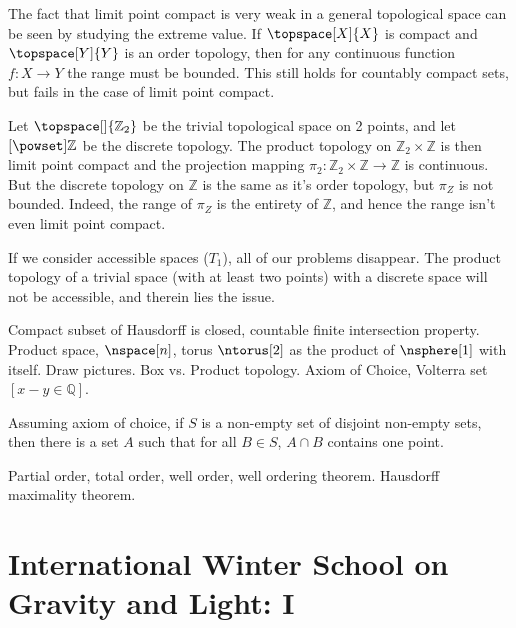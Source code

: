 \documentclass{article}                                                        %
\begin{document}
        The fact that limit point compact is very weak in a general topological
        space can be seen by studying the extreme value. If
        $\topspace[X]{X}$ is compact and $\topspace[Y]{Y}$ is an order topology,
        then for any continuous function $f:X\rightarrow{Y}$ the range must be
        bounded. This still holds for countably compact sets, but fails in the
        case of limit point compact.
        \begin{example}
            Let $\topspace[\empty]{\mathbb{Z}_{2}}$ be the trivial topological
            space on 2 points, and let $\mathcal[\powset]{\mathbb{Z}}$ be the
            discrete topology. The product topology on
            $\mathbb{Z}_{2}\times\mathbb{Z}$ is then limit point compact and the
            projection mapping
            $\pi_{2}:\mathbb{Z}_{2}\times\mathbb{Z}\rightarrow\mathbb{Z}$ is
            continuous. But the discrete topology on $\mathbb{Z}$ is the same as
            it's order topology, but $\pi_{Z}$ is not bounded. Indeed, the range
            of $\pi_{Z}$ is the entirety of $\mathbb{Z}$, and hence the range
            isn't even limit point compact.
        \end{example}
        If we consider accessible spaces ($T_{1}$), all of our problems
        disappear. The product topology of a trivial space (with at least two
        points) with a discrete space will not be accessible, and therein lies
        the issue.
        \par\hfill\par
        Compact subset of Hausdorff is closed, countable finite intersection
        property. Product space, $\nspace[n]$, torus $\ntorus[2]$ as the product
        of $\nsphere[1]$ with itself. Draw pictures. Box vs. Product topology.
        Axiom of Choice, Volterra set $[x-y\in\mathbb{Q}]$.
        \begin{theorem}
            Assuming axiom of choice, if $S$ is a non-empty set of disjoint
            non-empty sets, then there is a set $A$ such that for all
            $B\in{S}$, $A\cap{B}$ contains one point.
        \end{theorem}
        Partial order, total order, well order, well ordering theorem. Hausdorff
        maximality theorem.
    \section{International Winter School on Gravity and Light: I}
    
\end{document}
